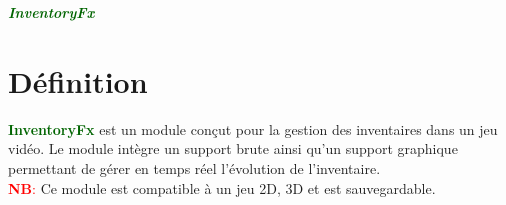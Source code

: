 \documentclass[a4paper, 11pt]{article}
\begin{document}
	\pagecolor{silver}
	\huge{\hspace{14.5cm}\textit{\textbf{\textcolor{darkgreen}{InventoryFx}}}}\large{} \tableofcontents
	\newpage
	\section{Définition}
	\textcolor{darkgreen}{\textbf{InventoryFx}} est un module conçut pour la gestion des inventaires dans un 
	jeu vidéo. Le module intègre un support brute ainsi qu'un support graphique permettant de gérer en temps 
	réel l'évolution de l'inventaire.\\
	\textcolor{red}{\textbf{NB}:} Ce module est compatible à un jeu 2D, 3D et est sauvegardable.

\end{document}
